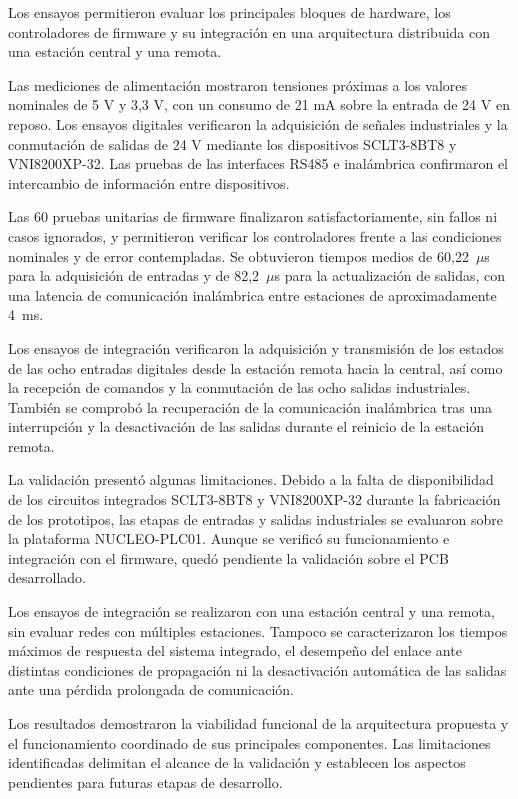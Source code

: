Los ensayos permitieron evaluar los principales bloques de hardware, los controladores de firmware y su integración en una arquitectura distribuida con una estación central y una remota.

Las mediciones de alimentación mostraron tensiones próximas a los valores nominales de 5 V y 3,3 V, con un consumo de 21 mA sobre la entrada de 24 V en reposo. Los ensayos digitales verificaron la adquisición de señales industriales y la conmutación de salidas de 24 V mediante los dispositivos SCLT3-8BT8 y VNI8200XP-32. Las pruebas de las interfaces RS485 e inalámbrica confirmaron el intercambio de información entre dispositivos.

Las 60 pruebas unitarias de firmware finalizaron satisfactoriamente, sin fallos ni casos ignorados, y permitieron verificar los controladores frente a las condiciones nominales y de error contempladas. Se obtuvieron tiempos medios de 60,22~$\mu$s para la adquisición de entradas y de 82,2~$\mu$s para la actualización de salidas, con una latencia de comunicación inalámbrica entre estaciones de aproximadamente 4~ms.

Los ensayos de integración verificaron la adquisición y transmisión de los estados de las ocho entradas digitales desde la estación remota hacia la central, así como la recepción de comandos y la conmutación de las ocho salidas industriales. También se comprobó la recuperación de la comunicación inalámbrica tras una interrupción y la desactivación de las salidas durante el reinicio de la estación remota.

La validación presentó algunas limitaciones. Debido a la falta de disponibilidad de los circuitos integrados SCLT3-8BT8 y VNI8200XP-32 durante la fabricación de los prototipos, las etapas de entradas y salidas industriales se evaluaron sobre la plataforma NUCLEO-PLC01. Aunque se verificó su funcionamiento e integración con el firmware, quedó pendiente la validación sobre el PCB desarrollado.

Los ensayos de integración se realizaron con una estación central y una remota, sin evaluar redes con múltiples estaciones. Tampoco se caracterizaron los tiempos máximos de respuesta del sistema integrado, el desempeño del enlace ante distintas condiciones de propagación ni la desactivación automática de las salidas ante una pérdida prolongada de comunicación.

Los resultados demostraron la viabilidad funcional de la arquitectura propuesta y el funcionamiento coordinado de sus principales componentes. Las limitaciones identificadas delimitan el alcance de la validación y establecen los aspectos pendientes para futuras etapas de desarrollo.

